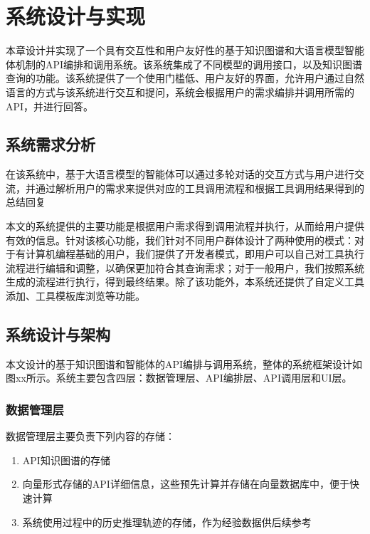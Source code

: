 
\chapter{系统设计与实现}

本章设计并实现了一个具有交互性和用户友好性的基于知识图谱和大语言模型智能体机制的API编排和调用系统。该系统集成了不同模型的调用接口，以及知识图谱查询的功能。该系统提供了一个使用门槛低、用户友好的界面，允许用户通过自然语言的方式与该系统进行交互和提问，系统会根据用户的需求编排并调用所需的API，并进行回答。

\section{系统需求分析}

在该系统中，基于大语言模型的智能体可以通过多轮对话的交互方式与用户进行交流，并通过解析用户的需求来提供对应的工具调用流程和根据工具调用结果得到的总结回复

本文的系统提供的主要功能是根据用户需求得到调用流程并执行，从而给用户提供有效的信息。针对该核心功能，我们针对不同用户群体设计了两种使用的模式：对于有计算机编程基础的用户，我们提供了开发者模式，即用户可以自己对工具执行流程进行编辑和调整，以确保更加符合其查询需求；对于一般用户，我们按照系统生成的流程进行执行，得到最终结果。除了该功能外，本系统还提供了自定义工具添加、工具模板库浏览等功能。

\section{系统设计与架构}
本文设计的基于知识图谱和智能体的API编排与调用系统，整体的系统框架设计如图xx所示。系统主要包含四层：数据管理层、API编排层、API调用层和UI层。

\subsection{数据管理层}
数据管理层主要负责下列内容的存储：
\begin{enumerate}
    \item API知识图谱的存储
    \item 向量形式存储的API详细信息，这些预先计算并存储在向量数据库中，便于快速计算
    \item 系统使用过程中的历史推理轨迹的存储，作为经验数据供后续参考
\end{enumerate}

